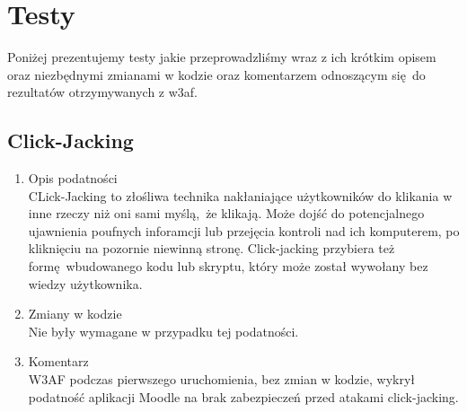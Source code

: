 \chapter{Testy}
\label{cha:testy}

Poniżej prezentujemy testy jakie przeprowadzliśmy wraz z ich krótkim opisem oraz niezbędnymi zmianami w kodzie oraz komentarzem odnoszącym się do rezultatów otrzymywanych z w3af.

\section{Click-Jacking}
\begin{enumerate}
\item Opis podatności\\
CLick-Jacking to złośliwa technika nakłaniające użytkowników do klikania w inne rzeczy niż oni sami myślą, że klikają.
Może dojść do potencjalnego ujawnienia poufnych inforamcji lub przejęcia kontroli nad ich komputerem, po kliknięciu na pozornie niewinną stronę. Click-jacking przybiera też formę wbudowanego kodu lub skryptu, który może został wywołany bez wiedzy użytkownika.
\item Zmiany w kodzie\\
Nie były wymagane w przypadku tej podatności.
\item Komentarz\\
W3AF podczas pierwszego uruchomienia, bez zmian w kodzie, wykrył podatność aplikacji Moodle na brak zabezpieczeń przed atakami click-jacking. 
\end{enumerate}

\noindent
\begin{minipage}{\linewidth}
\label{erd}
\end{minipage}

